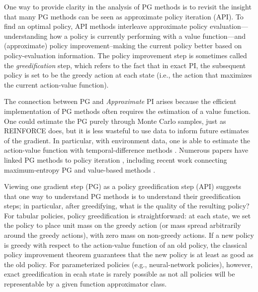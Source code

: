 \documentclass[\main/thesis.tex]{subfiles}
\begin{document}
One way to provide clarity in the analysis of PG methods is to revisit the insight that many PG methods can be seen as approximate policy iteration (API). To find an optimal policy, API methods \citep{bertsekas2011approximate,scherrer2014approximate} interleave approximate policy evaluation---understanding how a policy is currently performing with a value function---and (approximate) policy improvement--making the current policy better based on policy-evaluation information. The policy improvement step is sometimes called the \textit{greedification} step, which refers to the fact that in exact PI, the subsequent policy is set to be the greedy action at each state (i.e., the action that maximizes the current action-value function). 

The connection between PG and \emph{Approximate} PI arises because the efficient implementation of PG methods often requires the estimation of a value function. One could estimate the PG purely through Monte Carlo samples, just as REINFORCE \citep{williams1992simple} does, but it is less wasteful to use data to inform future estimates of the gradient. In particular, with environment data, one is able to estimate the action-value function with temporal-difference methods \citep{sutton2018reinforcement}. Numerous papers have linked PG methods to policy iteration \citep{sutton2000policy,kakade2002approximately,perkins2002existence,perkins2003convergent,wagner2011reinterpretation,wagner2013optimistic,scherrer2014local,bhandari2019global}, including recent work connecting maximum-entropy PG and value-based methods \citep{o2016combining,nachum2017bridging, schulman2017equivalence, nachum2019algaedice}.

Viewing one gradient step (PG) as a policy greedification step (API) suggests that one way to understand PG methods is to understand their greedification steps; in particular, after greedifying, what is the quality of the resulting policy? For tabular policies, policy greedification is straightforward: at each state, we set the policy to place unit mass on the greedy action (or mass spread arbitrarily around the greedy actions), with zero mass on non-greedy actions. If a new policy is greedy with respect to the action-value function of an old policy, the classical policy improvement theorem \citep{sutton2018reinforcement} guarantees that the new policy is at least as good as the old policy. For parameterized policies (e.g., neural-network policies), however, exact greedification in ecah state is rarely possible as not all policies will be representable by a given function approximator class. 
\end{document}
